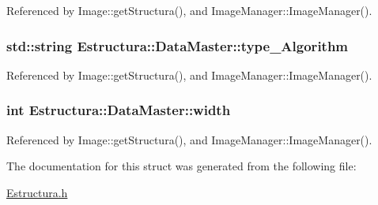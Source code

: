 Referenced by Image\+::get\+Structura(), and Image\+Manager\+::\+Image\+Manager().

\subsubsection[{\texorpdfstring{type\+\_\+\+Algorithm}{type_Algorithm}}]{\setlength{\rightskip}{0pt plus 5cm}std\+::string Estructura\+::\+Data\+Master\+::type\+\_\+\+Algorithm}\hypertarget{structEstructura_1_1DataMaster_accae7ba56def5fd845b33cb8cfb384fe}{}\label{structEstructura_1_1DataMaster_accae7ba56def5fd845b33cb8cfb384fe}


Referenced by Image\+::get\+Structura(), and Image\+Manager\+::\+Image\+Manager().

\subsubsection[{\texorpdfstring{width}{width}}]{\setlength{\rightskip}{0pt plus 5cm}int Estructura\+::\+Data\+Master\+::width}\hypertarget{structEstructura_1_1DataMaster_a52e88b0d0d52d7e61880e3689ef2e638}{}\label{structEstructura_1_1DataMaster_a52e88b0d0d52d7e61880e3689ef2e638}


Referenced by Image\+::get\+Structura(), and Image\+Manager\+::\+Image\+Manager().



The documentation for this struct was generated from the following file\+:\begin{DoxyCompactItemize}
\item 
\hyperlink{Estructura_8h}{Estructura.\+h}\end{DoxyCompactItemize}
